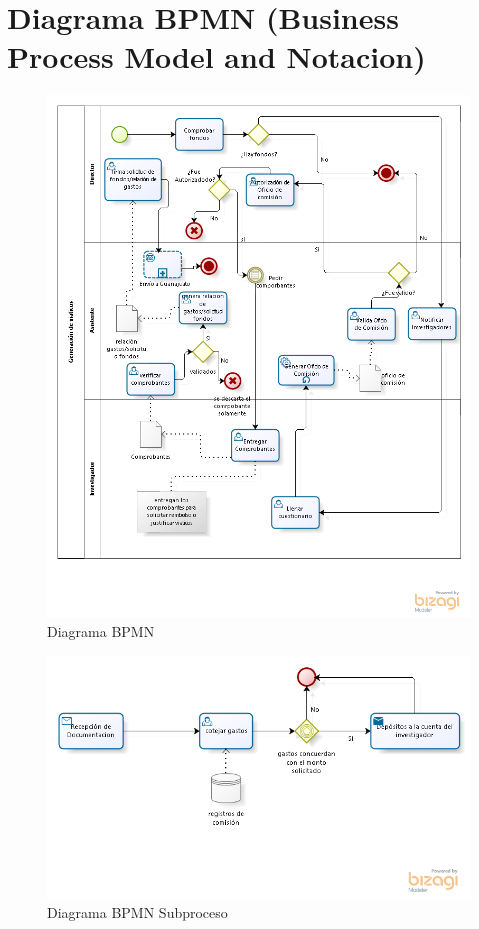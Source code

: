 \documentclass{report}
\begin{document}
    \section{Diagrama BPMN (Business Process Model and Notacion)}
    
    	\begin{figure}[H]
    		\centering
    			\includegraphics[scale=0.70]{images/1models/comision.png}  
    			\caption{Diagrama BPMN}  		
    	\end{figure}
    	
    	\begin{figure}[H]
    		\centering
    			\includegraphics[scale=0.80]{images/1models/envioGto.png}
    			\caption{Diagrama BPMN Subproceso}
    	\end{figure}
    
\end{document}
